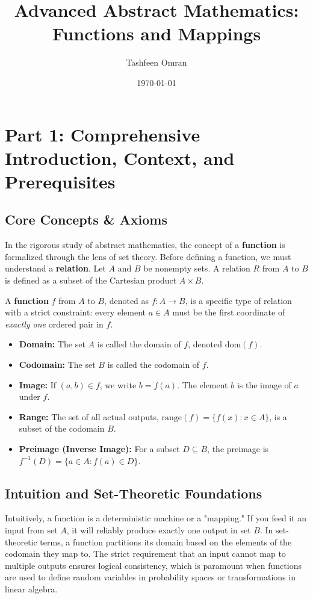 \documentclass[11pt, a4paper]{article}
\theoremstyle{definition}
\theoremstyle{remark}
\begin{document}
\title{\textbf{Advanced Abstract Mathematics: Functions and Mappings}}
\author{Tashfeen Omran}
\date{\today}
\maketitle

\tableofcontents
\newpage

\section{Part 1: Comprehensive Introduction, Context, and Prerequisites}

\subsection{Core Concepts \& Axioms}
In the rigorous study of abstract mathematics, the concept of a \textbf{function} is formalized through the lens of set theory. Before defining a function, we must understand a \textbf{relation}. Let $A$ and $B$ be nonempty sets. A relation $R$ from $A$ to $B$ is defined as a subset of the Cartesian product $A \times B$. 

A \textbf{function} $f$ from $A$ to $B$, denoted as $f: A \to B$, is a specific type of relation with a strict constraint: every element $a \in A$ must be the first coordinate of \textit{exactly one} ordered pair in $f$. 
\begin{itemize}
    \item \textbf{Domain:} The set $A$ is called the domain of $f$, denoted $\text{dom}(f)$.
    \item \textbf{Codomain:} The set $B$ is called the codomain of $f$.
    \item \textbf{Image:} If $(a, b) \in f$, we write $b = f(a)$. The element $b$ is the image of $a$ under $f$.
    \item \textbf{Range:} The set of all actual outputs, $\text{range}(f) = \{f(x) : x \in A\}$, is a subset of the codomain $B$.
    \item \textbf{Preimage (Inverse Image):} For a subset $D \subseteq B$, the preimage is $f^{-1}(D) = \{a \in A : f(a) \in D\}$.
\end{itemize}

\subsection{Intuition and Set-Theoretic Foundations}
Intuitively, a function is a deterministic machine or a "mapping." If you feed it an input from set $A$, it will reliably produce exactly one output in set $B$. In set-theoretic terms, a function partitions its domain based on the elements of the codomain they map to. The strict requirement that an input cannot map to multiple outputs ensures logical consistency, which is paramount when functions are used to define random variables in probability spaces or transformations in linear algebra.
\end{document}
